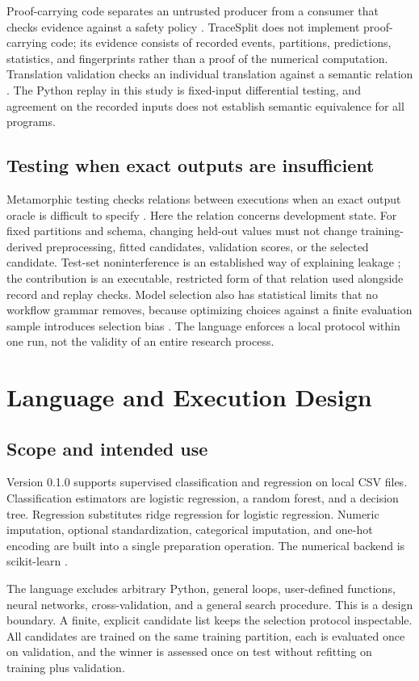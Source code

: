 \documentclass[lettersize,journal]{IEEEtran}
\newcommand{\tool}{TraceSplit}
\begin{document}
Proof-carrying code separates an untrusted producer from a consumer that checks evidence against a safety policy \cite{necula1997}. \tool{} does not implement proof-carrying code; its evidence consists of recorded events, partitions, predictions, statistics, and fingerprints rather than a proof of the numerical computation. Translation validation checks an individual translation against a semantic relation \cite{pnueli1998}. The Python replay in this study is fixed-input differential testing, and agreement on the recorded inputs does not establish semantic equivalence for all programs.

\subsection{Testing when exact outputs are insufficient}
Metamorphic testing checks relations between executions when an exact output oracle is difficult to specify \cite{segura2016}. Here the relation concerns development state. For fixed partitions and schema, changing held-out values must not change training-derived preprocessing, fitted candidates, validation scores, or the selected candidate. Test-set noninterference is an established way of explaining leakage \cite{yang2022}; the contribution is an executable, restricted form of that relation used alongside record and replay checks. Model selection also has statistical limits that no workflow grammar removes, because optimizing choices against a finite evaluation sample introduces selection bias \cite{cawley2010}. The language enforces a local protocol within one run, not the validity of an entire research process.

\section{Language and Execution Design}
\subsection{Scope and intended use}
Version 0.1.0 supports supervised classification and regression on local CSV files. Classification estimators are logistic regression, a random forest, and a decision tree. Regression substitutes ridge regression for logistic regression. Numeric imputation, optional standardization, categorical imputation, and one-hot encoding are built into a single preparation operation. The numerical backend is scikit-learn \cite{sklearn2011}.

The language excludes arbitrary Python, general loops, user-defined functions, neural networks, cross-validation, and a general search procedure. This is a design boundary. A finite, explicit candidate list keeps the selection protocol inspectable. All candidates are trained on the same training partition, each is evaluated once on validation, and the winner is assessed once on test without refitting on training plus validation.
\end{document}
